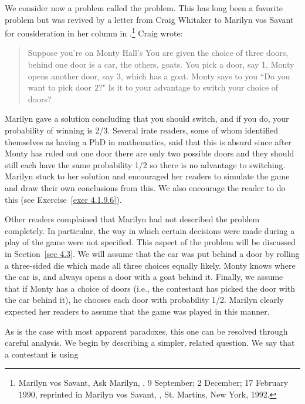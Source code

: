 \begin{example}\label{exam 4.5}
We consider now a problem called the  problem.   This
has long been a favorite problem but was revived by a letter from Craig Whitaker to Marilyn vos Savant for consideration in her column in .\footnote{Marilyn vos Savant, Ask Marilyn, , 9 
September;  2 December;  17  February 1990, reprinted in Marilyn vos Savant, , St. Martins, New York, 1992.}  Craig wrote:
\begin{quote}  Suppose you're on Monty Hall's  You are given the choice of
three doors, behind one door is a car, the others, goats.  You pick a door,
say 1, Monty opens another door, say 3, which has a goat.  Monty says to you ``Do you want to
pick door 2?" Is it to your advantage to switch your choice of doors?
\end{quote}
\par
Marilyn gave a solution concluding that you should switch, and if you do, your probability of
winning is 2/3.  Several irate readers, some of whom identified themselves as having a PhD in
mathematics, said that this is absurd since after Monty has ruled out one door there are only two
possible doors and they should still each have the same probability 1/2 so there is no advantage to
switching.  Marilyn stuck to her solution and encouraged her readers to simulate the game and draw
their own conclusions from this.  We also encourage the reader to do this (see
Exercise~\ref{exer 4.1.9.6}).
\par
Other readers complained that Marilyn had not described the problem completely.  In particular, the
way in which certain decisions were made during a play of the game were not specified.  This aspect
of the problem will be discussed in Section~\ref{sec 4.3}.  We will assume that the car was put
behind a door by rolling a three-sided die which made all three choices equally likely.  Monty
knows where the car is, and always opens a door with a goat behind it.  Finally, we assume that if 
Monty has a choice of doors (i.e., the contestant has picked the door with the car behind it), he
chooses each door with probability 1/2.  Marilyn
clearly expected her readers to assume that the game was played in this manner.
\par
As is the case with most apparent paradoxes, this one can be resolved through careful analysis.
We begin by describing a simpler, related question.  We say that a contestant is using

\end{example}
